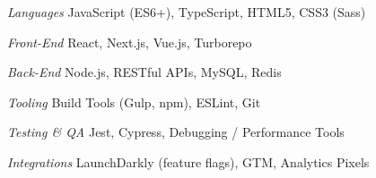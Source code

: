 \begin{minipage}[t]{0.53\textwidth}
\begin{cvskills}

  \cvskill
    {\textit{Languages}} %
    {JavaScript (ES6+), TypeScript, HTML5, CSS3 (Sass)} %


 \cvskill
    {\textit{Front-End}} %
    {React, Next.js, Vue.js, Turborepo} %


  \cvskill
    {\textit{Back-End}} %
    {Node.js, RESTful APIs, MySQL, Redis} %

 
\end{cvskills}
\end{minipage}%
\begin{minipage}[t]{0.47\textwidth}
\begin{cvskills}

  \cvskill
    {\textit{Tooling}} %
    {Build Tools (Gulp, npm), ESLint, Git} %


  \cvskill
    {\textit{Testing \& QA}} %
    {Jest, Cypress, Debugging / Performance Tools} %


  \cvskill
    {\textit{Integrations}} %
    {LaunchDarkly (feature flags), GTM, Analytics Pixels} %

\end{cvskills}
\end{minipage}

%

%